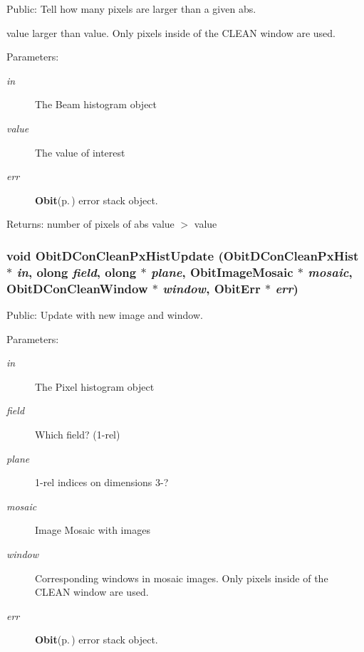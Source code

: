Public: Tell how many pixels are larger than a given abs. 

value larger than value. Only pixels inside of the CLEAN window are used. \begin{Desc}
\item[Parameters:]
\begin{description}
\item[{\em in}]The Beam histogram object \item[{\em value}]The value of interest \item[{\em err}]{\bf Obit}{\rm (p.\,\pageref{structObit})} error stack object. \end{description}
\end{Desc}
\begin{Desc}
\item[Returns:]number of pixels of abs value $>$ value \end{Desc}
\subsubsection{\setlength{\rightskip}{0pt plus 5cm}void Obit\-DCon\-Clean\-Px\-Hist\-Update ({\bf Obit\-DCon\-Clean\-Px\-Hist} $\ast$ {\em in}, {\bf olong} {\em field}, {\bf olong} $\ast$ {\em plane}, {\bf Obit\-Image\-Mosaic} $\ast$ {\em mosaic}, {\bf Obit\-DCon\-Clean\-Window} $\ast$ {\em window}, {\bf Obit\-Err} $\ast$ {\em err})}\label{ObitDConCleanPxHist_8h_a8}


Public: Update with new image and window. 

\begin{Desc}
\item[Parameters:]
\begin{description}
\item[{\em in}]The Pixel histogram object \item[{\em field}]Which field? (1-rel) \item[{\em plane}]1-rel indices on dimensions 3-? \item[{\em mosaic}]Image Mosaic with images \item[{\em window}]Corresponding windows in mosaic images. Only pixels inside of the CLEAN window are used. \item[{\em err}]{\bf Obit}{\rm (p.\,\pageref{structObit})} error stack object. \end{description}
\end{Desc}
